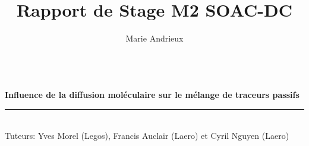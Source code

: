 \documentclass[a4paper,12pt]{article}
\date{}
\title{ \Large{Rapport de Stage M2 SOAC-DC}}
\author{Marie Andrieux}
\newcommand{\HRule}{\rule{\linewidth}{0.5mm}}
\newcommand{\blap}[1]{\vbox to 0pt{#1\vss}}
\newcommand\AtUpperLeftCorner[3]{%
  \put(\LenToUnit{#1},\LenToUnit{\dimexpr\paperheight-#2}){\blap{#3}}%
}
\newcommand\AtUpperRightCorner[3]{%
  \put(\LenToUnit{\dimexpr\paperwidth-#1},\LenToUnit{\dimexpr\paperheight-#2}){\blap{\llap{#3}}}%
}
\begin{document}
 
\thispagestyle{empty}

\let\noparref\ref
\renewcommand{\ref}[1]{(\noparref{#1})}


\begin{titlepage}
    \enlargethispage{2cm}
 
    \AddToShipoutPicture{
        }
 
    \begin{center}
        \vspace*{10cm}
        \textsc{\@title} \\
        \newline
        \large{\bf Influence de la diffusion moléculaire sur le mélange de traceurs passifs}
        \HRule
        \vspace*{0.5cm}
        \large{\@author} \\
        \newline
        \small{Tuteurs: Yves Morel (Legos), Francis Auclair (Laero) et Cyril Nguyen (Laero)}
        
    \end{center}
 
    \vspace*{9.2cm}
 
    \begin{center}
    \end{center}
 
\end{titlepage}
\ClearShipoutPicture

\newpage
\renewcommand{\thepage}{\arabic{page}}
\setcounter{page}{1}
\end{document}
